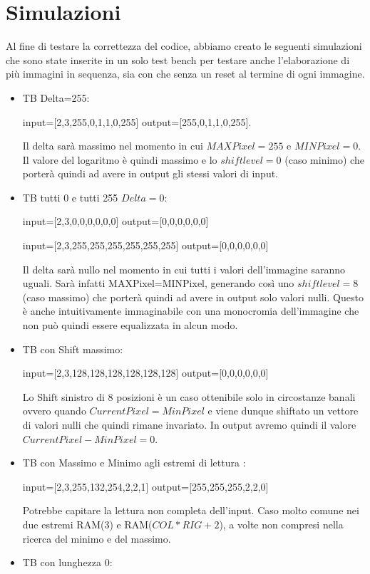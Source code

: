 \documentclass{article}
\begin{document}
\section{Simulazioni}
\label{main-text}
Al fine di testare la correttezza del codice, abbiamo creato le seguenti simulazioni che sono state inserite in un solo test bench per testare anche l'elaborazione di più immagini in sequenza, sia con che senza un reset al termine di ogni immagine.
\begin{itemize}
\item TB Delta=255:

 input=[2,3,255,0,1,1,0,255]
 output=[255,0,1,1,0,255].    
    
   Il delta sarà massimo nel momento in cui \(MAXPixel = 255\) e \(MINPixel = 0\). Il valore del logaritmo è quindi massimo e lo \(shiftlevel=0\) (caso minimo) che porterà quindi ad avere in output gli stessi valori di input.
\item TB tutti 0 e tutti 255 \(Delta=0\):

 input=[2,3,0,0,0,0,0,0] 
 output=[0,0,0,0,0,0]
 
  input=[2,3,255,255,255,255,255,255] 
 output=[0,0,0,0,0,0]
 
 Il delta sarà nullo nel momento in cui tutti i valori dell'immagine saranno uguali. Sarà infatti MAXPixel=MINPixel, generando così uno \(shiftlevel=8\) (caso massimo) che porterà quindi ad avere in output solo valori nulli. Questo è anche intuitivamente immaginabile con una monocromia dell'immagine che non può quindi essere equalizzata in alcun modo.
 \item TB con Shift massimo:
 
 input=[2,3,128,128,128,128,128,128] 
 output=[0,0,0,0,0,0]

Lo Shift sinistro di 8 posizioni è un caso ottenibile solo in circostanze banali ovvero quando \(CurrentPixel = MinPixel\) e viene dunque shiftato un vettore di valori nulli che quindi rimane invariato. In output avremo quindi il valore \(CurrentPixel - MinPixel = 0\).

\item TB con Massimo e Minimo agli estremi di lettura : 
 
 input=[2,3,255,132,254,2,2,1] 
 output=[255,255,255,2,2,0]
 
 Potrebbe capitare la lettura non completa dell'input. Caso molto comune nei due estremi RAM(3) e RAM(\(COL*RIG+2\)), a volte non compresi nella ricerca del minimo e del massimo.
 \item TB con lunghezza 0:


\end{itemize}
\end{document}
